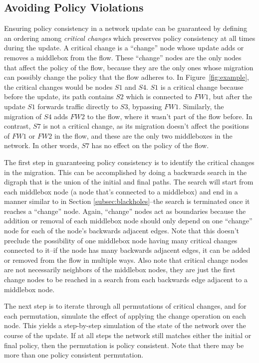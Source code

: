 \documentclass[pageno]{jpaper}
\begin{document}
\subsection{Avoiding Policy Violations}
\label{subsec:policy}
Ensuring policy consistency in a network update can be guaranteed by defining an ordering among \textit{critical changes} which preserves policy consistency at all times during the update. A critical change is a ``change'' node whose update adds or removes a middlebox from the flow. These ``change'' nodes are the only nodes that affect the policy of the flow, because they are the only ones whose migration can possibly change the policy that the flow adheres to. In Figure~\ref{fig:example}, the critical changes would be nodes $S1$ and $S4$. $S1$ is a critical change because before the update, its path contains $S2$ which is connected to $FW1$, but after the update $S1$ forwards traffic directly to $S3$, bypassing $FW1$. Similarly, the migration of $S4$ adds $FW2$ to the flow, where it wasn't part of the flow before. In contrast, $S7$ is not a critical change, as its migration doesn't affect the positions of $FW1$ or $FW2$ in the flow, and these are the only two middleboxes in the network. In other words, $S7$ has no effect on the policy of the flow.

The first step in guaranteeing policy consistency is to identify the critical changes in the migration. This can be accomplished by doing a backwards search in the digraph that is the union of the initial and final paths. The search will start from each middlebox node (a node that's connected to a middlebox) and end in a manner similar to in Section \ref{subsec:blackholes}--the search is terminated once it reaches a ``change'' node. Again, ``change'' nodes act as boundaries because the addition or removal of each middlebox node should only depend on one ``change'' node for each of the node's backwards adjacent edges. Note that this doesn't preclude the possibility of one middlebox node having many critical changes connected to it--if the node has many backwards adjacent edges, it can be added or removed from the flow in multiple ways. Also note that critical change nodes are not necessarily neighbors of the middlebox nodes, they are just the first change nodes to be reached in a search from each backwards edge adjacent to a middlebox node.

The next step is to iterate through all permutations of critical changes, and for each permutation, simulate the effect of applying the change operation on each node. This yields a step-by-step simulation of the state of the network over the course of the update. If at all steps the network still matches either the initial or final policy, then the permutation is policy consistent. Note that there may be more than one policy consistent permutation.
\end{document}
